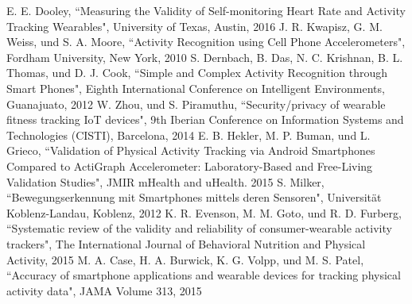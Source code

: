 \documentclass[conference]{IEEEtran}
\begin{document}
\begin{thebibliography}{00}
 E. E. Dooley, ``Measuring the Validity of Self-monitoring Heart Rate and Activity Tracking Wearables", University of Texas, Austin, 2016
 J. R. Kwapisz, G. M. Weiss, und S. A. Moore, ``Activity Recognition using Cell Phone Accelerometers", Fordham University, New York, 2010
 S. Dernbach, B. Das, N. C. Krishnan, B. L. Thomas, und D. J. Cook, ``Simple and Complex Activity Recognition through Smart Phones", Eighth International Conference on Intelligent Environments, Guanajuato, 2012
 W. Zhou, und S. Piramuthu, ``Security/privacy of wearable fitness tracking IoT devices", 9th Iberian Conference on Information Systems and Technologies (CISTI), Barcelona, 2014
 E. B. Hekler, M. P. Buman, und L. Grieco, ``Validation of Physical Activity Tracking via Android Smartphones Compared to ActiGraph Accelerometer: Laboratory-Based and Free-Living Validation Studies", JMIR mHealth and uHealth. 2015
 S. Milker, ``Bewegungserkennung mit Smartphones mittels deren Sensoren", Universität Koblenz-Landau, Koblenz, 2012
 K. R. Evenson, M. M. Goto, und R. D. Furberg, ``Systematic review of the validity and reliability of consumer-wearable activity trackers", The International Journal of Behavioral Nutrition and Physical Activity, 2015
 M. A. Case, H. A. Burwick, K. G. Volpp, und M. S. Patel, ``Accuracy of smartphone applications and wearable devices for tracking physical activity data", JAMA Volume 313, 2015
\end{thebibliography}
\end{document}
